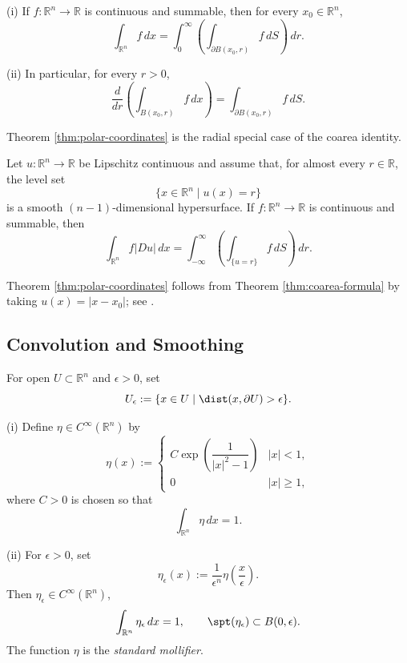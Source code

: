 \begin{theorem}
\label{thm:polar-coordinates}
(i) If $f:\mathbb R^n\to\mathbb R$ is continuous and summable, then for every $x_0\in\mathbb R^n$,
\[
\int_{\mathbb R^n}f\,dx
=\int_0^\infty
\left(\int_{\partial B(x_0,r)}f\,dS\right)\,dr.
\]

(ii) In particular, for every $r>0$,
\[
\frac d{dr}\left(\int_{B(x_0,r)}f\,dx\right)
=\int_{\partial B(x_0,r)}f\,dS.
\]
\end{theorem}

Theorem \ref{thm:polar-coordinates} is the radial special case of the coarea identity.

\begin{theorem}
\label{thm:coarea-formula}
Let $u:\mathbb R^n\to\mathbb R$ be Lipschitz continuous and assume that, for almost every $r\in\mathbb R$, the level set
\[
\{x\in\mathbb R^n\mid u(x)=r\}
\]
is a smooth $(n-1)$-dimensional hypersurface. If $f:\mathbb R^n\to\mathbb R$ is continuous and summable, then
\[
\int_{\mathbb R^n}f|Du|\,dx
=\int_{-\infty}^\infty
\left(\int_{\{u=r\}}f\,dS\right)\,dr.
\]
\end{theorem}

Theorem \ref{thm:polar-coordinates} follows from Theorem \ref{thm:coarea-formula} by taking $u(x)=|x-x_0|$; see \cite[Chapter 3]{EvansGariepy1992}.

\subsection{Convolution and Smoothing}

\begin{definition}
\label{def:epsilon-interior-set-notation}
For open $U\subset\mathbb R^n$ and $\epsilon>0$, set
\[
U_\epsilon
:=\{x\in U\mid\dist(x,\partial U)>\epsilon\}.
\]
\end{definition}

\begin{definition}
\label{def:standard-mollifier}
(i) Define $\eta\in C^\infty(\mathbb R^n)$ by
\[
\eta(x):=
\begin{cases}
C\exp\!\left(\dfrac{1}{|x|^2-1}\right) & |x|<1,\\
0 & |x|\geq1,
\end{cases}
\]
where $C>0$ is chosen so that
\[
\int_{\mathbb R^n}\eta\,dx=1.
\]

(ii) For $\epsilon>0$, set
\[
\eta_\epsilon(x)
:=\frac1{\epsilon^n}\eta\left(\frac x\epsilon\right).
\]
Then $\eta_\epsilon\in C^\infty(\mathbb R^n)$,
\[
\int_{\mathbb R^n}\eta_\epsilon\,dx=1,
\qquad
\spt(\eta_\epsilon)\subset B(0,\epsilon).
\]
The function $\eta$ is the \textit{standard mollifier}.
\end{definition}

